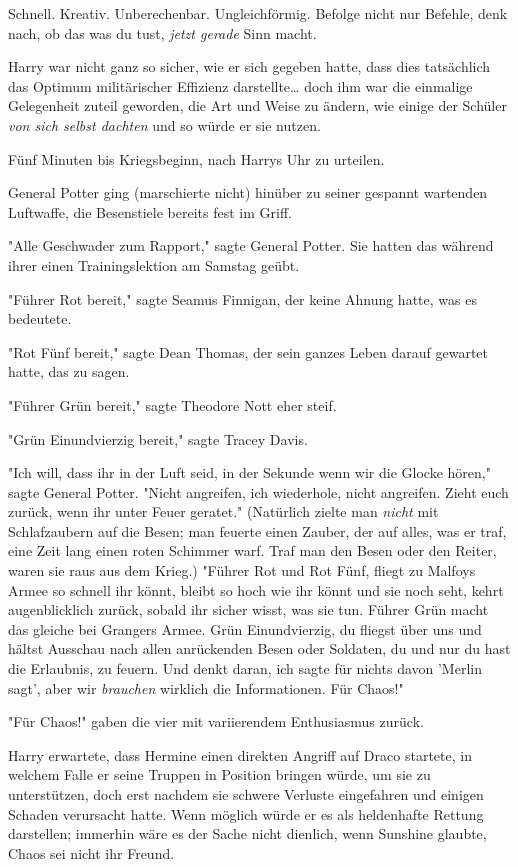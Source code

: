 {Schnell. Kreativ. Unberechenbar. Ungleichförmig. Befolge nicht nur Befehle, denk nach, ob das was du tust, \emph{jetzt gerade} Sinn macht.

Harry war nicht ganz so sicher, wie er sich gegeben hatte, dass dies tatsächlich das Optimum militärischer Effizienz darstellte… doch ihm war die einmalige Gelegenheit zuteil geworden, die Art und Weise zu ändern, wie einige der Schüler \emph{von sich selbst dachten} und so würde er sie nutzen.

Fünf Minuten bis Kriegsbeginn, nach Harrys Uhr zu urteilen.

General Potter ging (marschierte nicht) hinüber zu seiner gespannt wartenden Luftwaffe, die Besenstiele bereits fest im Griff.

"Alle Geschwader zum Rapport," sagte General Potter. Sie hatten das während ihrer einen Trainingslektion am Samstag geübt.

"Führer Rot bereit," sagte Seamus Finnigan, der keine Ahnung hatte, was es bedeutete.

"Rot Fünf bereit," sagte Dean Thomas, der sein ganzes Leben darauf gewartet hatte, das zu sagen.

"Führer Grün bereit," sagte Theodore Nott eher steif.

"Grün Einundvierzig bereit," sagte Tracey Davis.

"Ich will, dass ihr in der Luft seid, in der Sekunde wenn wir die Glocke hören," sagte General Potter. "Nicht angreifen, ich wiederhole, nicht angreifen. Zieht euch zurück, wenn ihr unter Feuer geratet." (Natürlich zielte man \emph{nicht} mit Schlafzaubern auf die Besen; man feuerte einen Zauber, der auf alles, was er traf, eine Zeit lang einen roten Schimmer warf. Traf man den Besen oder den Reiter, waren sie raus aus dem Krieg.) "Führer Rot und Rot Fünf, fliegt zu Malfoys Armee so schnell ihr könnt, bleibt so hoch wie ihr könnt und sie noch seht, kehrt augenblicklich zurück, sobald ihr sicher wisst, was sie tun. Führer Grün macht das gleiche bei Grangers Armee. Grün Einundvierzig, du fliegst über uns und hältst Ausschau nach allen anrückenden Besen oder Soldaten, du und nur du hast die Erlaubnis, zu feuern. Und denkt daran, ich sagte für nichts davon 'Merlin sagt', aber wir \emph{brauchen} wirklich die Informationen. Für Chaos!"

"Für Chaos!" gaben die vier mit variierendem Enthusiasmus zurück.

Harry erwartete, dass Hermine einen direkten Angriff auf Draco startete, in welchem Falle er seine Truppen in Position bringen würde, um sie zu unterstützen, doch erst nachdem sie schwere Verluste eingefahren und einigen Schaden verursacht hatte. Wenn möglich würde er es als heldenhafte Rettung darstellen; immerhin wäre es der Sache nicht dienlich, wenn Sunshine glaubte, Chaos sei nicht ihr Freund.

}
